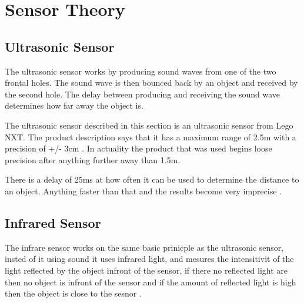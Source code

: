\chapter{Sensor Theory} 
\section{Ultrasonic Sensor}
The ultrasonic sensor works by producing sound waves from one of the two
frontal holes. The sound wave is then bounced back by an object and received by
the second hole. The delay between producing and receiving the sound wave
determines how far away the object is.

The ultrasonic sensor described in this section is an ultrasonic sensor from
Lego NXT. The product description says that it has a maximum range of 2.5m with
a precision of +/- 3cm \citep{Ultrasonic_sensor}\KT. In actuality the product
that was used begins loose precision after anything further away than 1.5m.

There is a delay of 25ms at how often it can be used to determine the distance
to an object. Anything faster than that and the results become very imprecise
\Source.

\section{Infrared Sensor}
The infrare sensor works on the same basic prinicple as the ultrasonic sensor,
insted of it using sound it uses infrared light, and mesures the intensitivit of
the light reflected by the object infront of the sensor, if there no reflected
light are then no object is infront of the sensor and if the amount of reflected
light is high then the object is close to the sesnor \Source.













